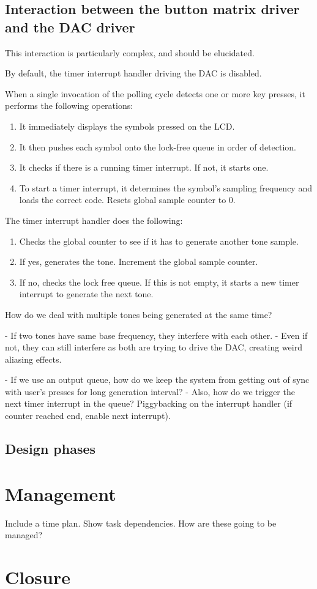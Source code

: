 \documentclass[11pt,a4paper
]{scrartcl}
\begin{document}
\subsection{Interaction between the button matrix driver and the DAC driver}

This interaction is particularly complex, and should be elucidated.

By default, the timer interrupt handler driving the DAC is disabled.

When a single invocation of the polling cycle detects one or more key presses, it performs the following operations:

\begin{enumerate}
   \item It immediately displays the symbols pressed on the LCD.
   \item It then pushes each symbol onto the lock-free queue in order of detection.
   \item It checks if there is a running timer interrupt. If not, it starts one.
   \item To start a timer interrupt, it determines the symbol's sampling frequency and loads the correct code. Resets global sample counter to 0.
\end{enumerate}

The timer interrupt handler does the following:

\begin{enumerate}
   \item Checks the global counter to see if it has to generate another tone sample.
   \item If yes, generates the tone. Increment the global sample counter.
   \item If no, checks the lock free queue. If this is not empty, it starts a new timer interrupt to generate the next tone.
\end{enumerate}

How do we deal with multiple tones being generated at the same time?

- If two tones have same base frequency, they interfere with each other.
- Even if not, they can still interfere as both are trying to drive the DAC, creating weird aliasing effects.

- If we use an output queue, how do we keep the system from getting out of sync with user's presses for long generation interval?
- Also, how do we trigger the next timer interrupt in the queue? Piggybacking on the interrupt handler (if counter reached end, enable next interrupt).

\subsection{Design phases}


\section{Management}
Include a time plan.
Show task dependencies.
How are these going to be managed?

\section{Closure}



\end{document}
